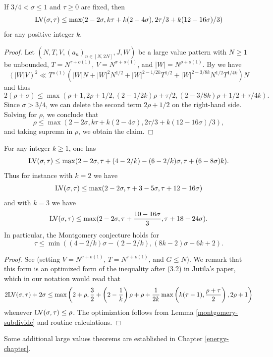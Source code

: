\begin{lemma}\label{hb-lvt-2} If $3/4 < \sigma \leq 1$ and $\tau \geq 0$ are fixed, then
    $$ \mathrm{LV}(\sigma,\tau) \leq \max( 2-2\sigma, k\tau + k(2-4\sigma), 2\tau/3 + k(12-16\sigma)/3 )$$
    for any positive integer $k$.
    \end{lemma}

\begin{proof} Let $(N,T,V,(a_n)_{n \in [N,2N]},J,W)$ be a large value pattern with $N \geq 1$ be unbounded, $T = N^{\tau + o(1)}$,  $V = N^{\sigma + o(1)}$, and $|W| = N^{\rho+o(1)}$. By \cite[Lemma~6]{heathbrown_large_1979} we have
    $$ (|W| V)^2 \ll T^{o(1)}( |W|N + |W|^2 N^{1/2} + |W|^{2-1/2k} T^{1/2} + |W|^{2-3/8k} N^{1/2} T^{1/4k}) N$$
and thus
$$ 2(\rho + \sigma) \leq \max( \rho+1, 2\rho+1/2, (2-1/2k)\rho + \tau/2, (2-3/8k)\rho + 1/2 + \tau/4k).$$
Since $\sigma > 3/4$, we can delete the second term $2\rho+1/2$ on the right-hand side. Solving for $\rho$, we conclude that
$$ \rho \leq \max( 2-2\sigma, k\tau + k(2-4\sigma), 2\tau/3 + k(12-16\sigma)/3 ),$$
and taking suprema in $\rho$, we obtain the claim.
\end{proof}

\begin{theorem}\label{jutila-lvt}  For any integer $k \geq 1$, one has
$$ \mathrm{LV}(\sigma,\tau) \leq \max(2-2\sigma, \tau + (4-2/k) - (6-2/k)\sigma, \tau + (6-8\sigma)k).$$
Thus for instance with $k=2$ we have
$$ \mathrm{LV}(\sigma,\tau) \leq \max(2-2\sigma, \tau + 3 - 5\sigma, \tau + 12-16\sigma)$$
and with $k=3$ we have
$$ \mathrm{LV}(\sigma,\tau) \leq \max(2-2\sigma, \tau + \frac{10-16\sigma}{3}, \tau + 18-24\sigma).$$
In particular, the Montgomery conjecture holds for
$$ \tau \leq \min( (4-2/k)\sigma - (2-2/k), (8k-2)\sigma - 6k + 2).$$
\end{theorem}

\literature
{}

\begin{proof} See \cite[(1.4)]{jutila_zero_density_1977} (setting $V = N^{\sigma+o(1)}$, $T = N^{\tau+o(1)}$, and $G \leq N$).  We remark that this form is an optimized form of the inequality after (3.2) in Jutila's paper, which in our notation would read that
$$ 2\mathrm{LV}(\sigma,\tau) + 2\sigma \leq \max \left(2 + \rho, \frac{3}{2} + \left(2 - \frac{1}{k}\right)\rho + \rho + \frac{1}{2k}\max\left(k(\tau-1), \frac{\rho+\tau}{2}\right), 2\rho + 1\right)$$
whenever $\mathrm{LV}(\sigma,\tau) \leq \rho$.  The optimization follows from Lemma \ref{montgomery-subdivide} and routine calculations.
\end{proof}

Some additional large values theorems are established in Chapter \ref{energy-chapter}.
